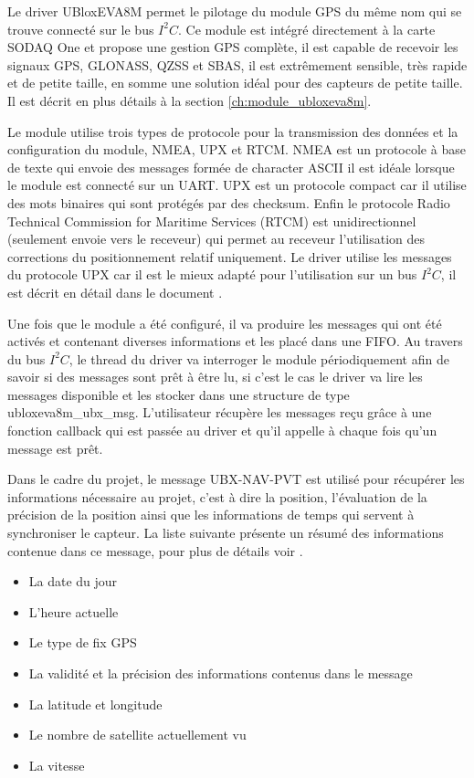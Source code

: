 Le driver UBloxEVA8M permet le pilotage du module GPS du même nom qui se trouve connecté sur le bus $I^{2}C$. Ce module est intégré directement à la carte SODAQ One et propose une gestion GPS complète, il est capable de recevoir les signaux GPS, GLONASS, QZSS et SBAS, il est extrêmement sensible, très rapide et de petite taille, en somme une solution idéal pour des capteurs de petite taille. Il est décrit en plus détails à la section \ref{ch:module_ubloxeva8m}. 

Le module utilise trois types de protocole pour la transmission des données et la configuration du module, NMEA, UPX et RTCM. NMEA est un protocole à base de texte qui envoie des messages formée de character ASCII il est idéale lorsque le module est connecté sur un UART. UPX est un protocole compact car il utilise des mots binaires qui sont protégés par des checksum. Enfin le protocole Radio Technical Commission for Maritime Services (RTCM) est unidirectionnel (seulement envoie vers le receveur) qui permet au receveur l'utilisation des corrections du positionnement relatif uniquement.
Le driver utilise les messages du protocole UPX car il est le mieux adapté pour l'utilisation sur un bus $I^{2}C$, il est décrit en détail dans le document \cite{ublox-protocol}.

Une fois que le module a été configuré, il va produire les messages qui ont été activés et contenant diverses informations et les placé dans une FIFO. Au travers du bus $I^{2}C$, le thread du driver va interroger le module périodiquement afin de savoir si des messages sont prêt à être lu, si c'est le cas le driver va lire les messages disponible et les stocker dans une structure de type ubloxeva8m\_ubx\_msg. L'utilisateur récupère les messages reçu grâce à une fonction callback qui est passée au driver et qu'il appelle à chaque fois qu'un message est prêt.

Dans le cadre du projet, le message UBX-NAV-PVT est utilisé pour récupérer les informations nécessaire au projet, c'est à dire la position, l'évaluation de la précision de la position ainsi que les informations de temps qui servent à synchroniser le capteur. La liste suivante présente un résumé des informations contenue dans ce message, pour plus de détails voir \cite[p.~307]{ublox-protocol}.

\begin{itemize}
 \item La date du jour
 \item L'heure actuelle 
 \item Le type de fix GPS
 \item La validité et la précision des informations contenus dans le message
 \item La latitude et longitude
 \item Le nombre de satellite actuellement vu
 \item La vitesse
 \end{itemize} 

